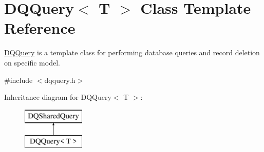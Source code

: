 \hypertarget{classDQQuery}{
\section{DQQuery$<$ T $>$ Class Template Reference}
\label{classDQQuery}
}


\hyperlink{classDQQuery}{DQQuery} is a template class for performing database queries and record deletion on specific model.  




{\ttfamily \#include $<$dqquery.h$>$}

Inheritance diagram for DQQuery$<$ T $>$:\begin{figure}[H]
\begin{center}
\leavevmode
\includegraphics[height=2.000000cm]{classDQQuery}
\end{center}
\end{figure}
